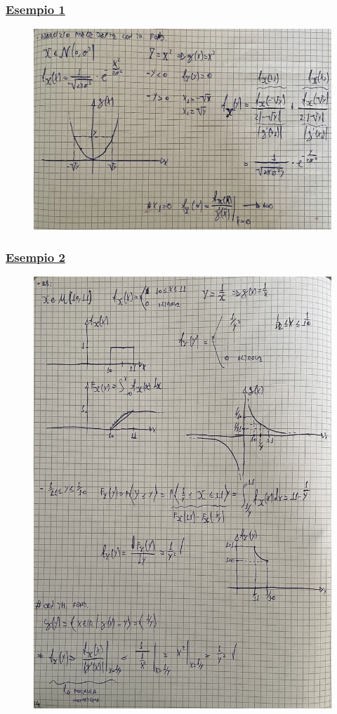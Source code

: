 \documentclass{article}
\begin{document}
\subsubsection{\underline{Esempio 1}}
\begin{figure}[ht]
\centering
\includegraphics[scale=0.15]{ese/18.jpeg}
\end{figure}
\clearpage
\subsubsection{\underline{Esempio 2}}
\begin{figure}[ht]
\centering
\includegraphics[scale=0.15]{ese/19.jpeg}
\end{figure}
\clearpage
\end{document}
